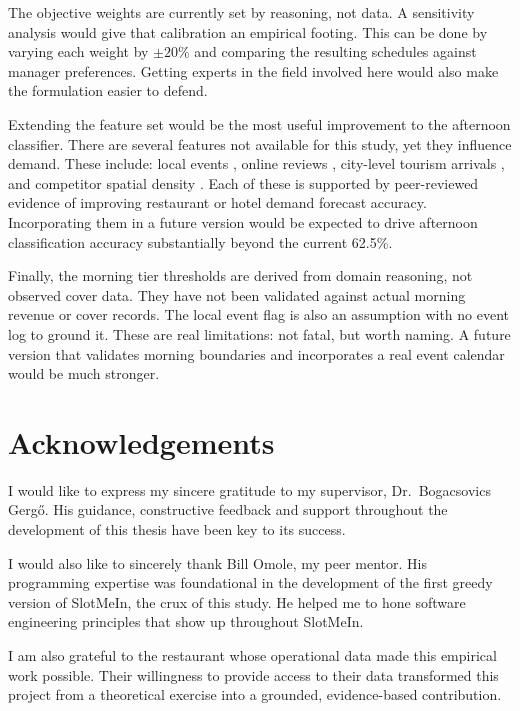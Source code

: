 \documentclass[12pt,a4paper,oneside]{article}
\begin{document}
The objective weights are currently set by reasoning, not data. A sensitivity analysis would give that calibration an empirical footing. This can be done by varying each weight by $\pm 20\%$ and comparing the resulting schedules against manager preferences. Getting experts in the field involved here would also make the formulation easier to defend.

Extending the feature set would be the most useful improvement to the afternoon classifier. There are several features not available for this study, yet they influence demand. These include: local events \citep{lasek2016}, online reviews \citep{wu2024}, city-level tourism arrivals \citep{sun2019}, and competitor spatial density \citep{liu2025}. Each of these is supported by peer-reviewed evidence of improving restaurant or hotel demand forecast accuracy. Incorporating them in a future version would be expected to drive afternoon classification accuracy substantially beyond the current 62.5\%.

Finally, the morning tier thresholds are derived from domain reasoning, not observed cover data. They have not been validated against actual morning revenue or cover records. The local event flag is also an assumption with no event log to ground it. These are real limitations: not fatal, but worth naming. A future version that validates morning boundaries and incorporates a real event calendar would be much stronger. 
\newpage

\section*{Acknowledgements}

I would like to express my sincere gratitude to my supervisor, Dr.~Bogacsovics Gerg\H{o}. His guidance, constructive feedback and support throughout the development of this thesis have been key to its success. 

I would also like to sincerely thank Bill Omole, my peer mentor. His programming expertise was foundational in the development of the first greedy version of SlotMeIn, the crux of this study. He helped me to hone software engineering principles that show up throughout SlotMeIn.

I am also grateful to the restaurant whose operational data made this empirical work possible. Their willingness to provide access to their data transformed this project from a theoretical exercise into a grounded, evidence-based contribution. 
\end{document}
